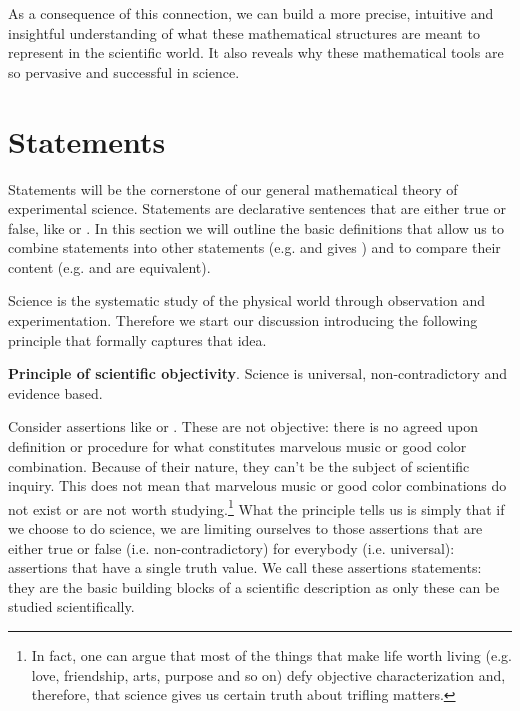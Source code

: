 \documentclass[11pt,letterpaper,fleqn]{memoir} %
\begin{document}
As a consequence of this connection, we can build a more precise, intuitive and insightful understanding of what these mathematical structures are meant to represent in the scientific world. It also reveals why these mathematical tools are so pervasive and successful in science.

\section{Statements}

Statements will be the cornerstone of our general mathematical theory of experimental science. Statements are declarative sentences that are either true or false, like  or . In this section we will outline the basic definitions that allow us to combine statements into other statements (e.g.  and  gives ) and to compare their content (e.g.  and  are equivalent).

Science is the systematic study of the physical world through observation and experimentation. Therefore we start our discussion introducing the following principle that formally captures that idea.

\begin{mathSection}
	\textbf{Principle of scientific objectivity}.
		Science is universal, non-contradictory and evidence based.
\end{mathSection}

Consider assertions like  or . These are not objective: there is no agreed upon definition or procedure for what constitutes marvelous music or good color combination. Because of their nature, they can't be the subject of scientific inquiry. This does not mean that marvelous music or good color combinations do not exist or are not worth studying.\footnote{In fact, one can argue that most of the things that make life worth living (e.g. love, friendship, arts, purpose and so on) defy objective characterization and, therefore, that science gives us certain truth about trifling matters.} What the principle tells us is simply that if we choose to do science, we are limiting ourselves to those assertions that are either true or false (i.e. non-contradictory) for everybody (i.e. universal): assertions that have a single truth value. We call these assertions statements: they are the basic building blocks of a scientific description as only these can be studied scientifically.
\end{document}
